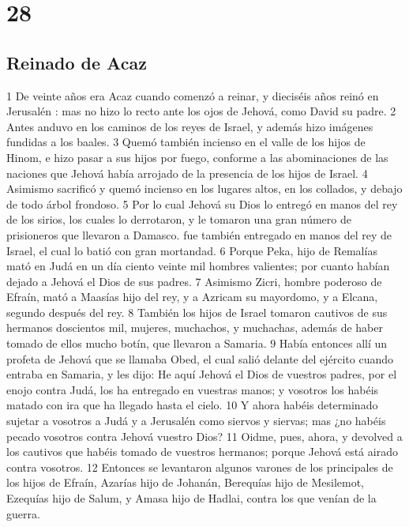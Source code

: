 \chapter{28}

\section*{Reinado de Acaz}

 

1 De veinte años era Acaz cuando comenzó a reinar, y dieciséis años reinó en Jerusalén : mas no hizo lo recto ante los ojos de Jehová, como David su padre.
2 Antes anduvo en los caminos de los reyes de Israel, y además hizo imágenes fundidas a los baales.
3 Quemó también incienso en el valle de los hijos de Hinom, e hizo pasar a sus hijos por fuego, conforme a las abominaciones de las naciones que Jehová había arrojado de la presencia de los hijos de Israel.
4 Asimismo sacrificó y quemó incienso en los lugares altos, en los collados, y debajo de todo árbol frondoso.
5 Por lo cual Jehová su Dios lo entregó en manos del rey de los sirios, los cuales lo derrotaron, y le tomaron una gran número de prisioneros que llevaron a Damasco. fue también entregado en manos del rey de Israel, el cual lo batió con gran mortandad.
6 Porque Peka, hijo de Remalías mató en Judá en un día ciento veinte mil hombres valientes; por cuanto habían dejado a Jehová el Dios de sus padres. 
7 Asimismo Zicri, hombre poderoso de Efraín, mató a Maasías hijo del rey, y a Azricam su mayordomo, y a Elcana, segundo después del rey.
8 También los hijos de Israel tomaron cautivos de sus hermanos doscientos mil, mujeres, muchachos, y muchachas, además de haber tomado de ellos mucho botín, que llevaron a Samaria.
9 Había entonces allí un profeta de Jehová que se llamaba Obed, el cual salió delante del ejército cuando entraba en Samaria, y les dijo: He aquí Jehová el Dios de vuestros padres, por el enojo contra Judá, los ha entregado en vuestras manos; y vosotros los habéis matado con ira que ha llegado hasta el cielo.
10 Y ahora habéis determinado sujetar a vosotros a Judá y a Jerusalén  como siervos y siervas; mas ¿no habéis pecado vosotros contra Jehová vuestro Dios?
11 Oidme, pues, ahora, y devolved a los cautivos que habéis tomado de vuestros hermanos; porque Jehová está airado contra vosotros.
12 Entonces se levantaron algunos varones de los principales de los hijos de Efraín, Azarías hijo de Johanán,  Berequías hijo de Mesilemot, Ezequías hijo de Salum, y Amasa hijo de Hadlai, contra los que venían de la guerra.
